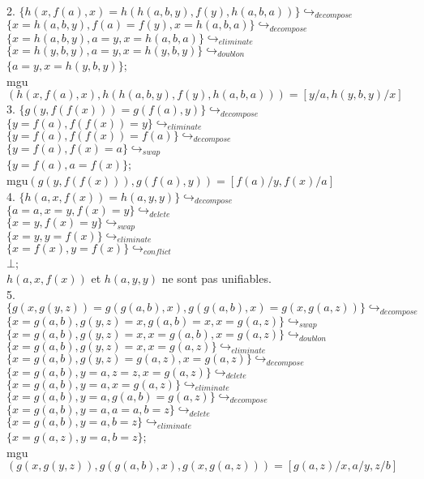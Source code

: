 \documentclass[11pt,letterpaper]{article}
\newcommand\tab[1][12pt]{\hspace*{#1}}
\begin{document}
2. $\{h(x,f(a),x) = h(h(a,b,y),f(y),h(a,b,a))\} \hookrightarrow_{decompose}$\\\tab
$\{x=h(a,b,y), f(a)=f(y), x=h(a,b,a)\} \hookrightarrow_{decompose}$\\\tab
$\{x=h(a,b,y), a=y, x=h(a,b,a)\} \hookrightarrow_{eliminate}$\\\tab
$\{x=h(y,b,y), a=y, x=h(y,b,y)\} \hookrightarrow_{doublon}$\\\tab
$\{a=y, x=h(y,b,y)\}$;\\\tab
mgu$(h(x,f(a),x),h(h(a,b,y),f(y),h(a,b,a))) = [y/a,h(y,b,y)/x]$\\

3. $\{g(y,f(f(x))) = g(f(a),y)\} \hookrightarrow_{decompose}$\\\tab
$\{y=f(a),f(f(x))=y\} \hookrightarrow_{eliminate}$\\\tab
$\{y=f(a),f(f(x))=f(a)\} \hookrightarrow_{decompose}$\\\tab
$\{y=f(a),f(x)=a\} \hookrightarrow_{swap}$\\\tab
$\{y=f(a),a=f(x)\}$;\\\tab
mgu$(g(y,f(f(x))),g(f(a),y)) = [f(a)/y,f(x)/a]$\\

4. $\{h(a,x,f(x)) = h(a,y,y)\} \hookrightarrow_{decompose}$\\\tab
$\{a=a,x=y,f(x)=y\} \hookrightarrow_{delete}$\\\tab
$\{x=y,f(x)=y\} \hookrightarrow_{swap}$\\\tab
$\{x=y,y=f(x)\} \hookrightarrow_{eliminate}$\\\tab
$\{x=f(x),y=f(x)\} \hookrightarrow_{conflict}$\\\tab
$\bot$;\\\tab
$h(a,x,f(x))$ et $h(a,y,y)$ ne sont pas unifiables.\\

5. $\{g(x,g(y,z)) = g(g(a,b),x), g(g(a,b),x) = g(x,g(a,z))\} \hookrightarrow_{decompose}$\\\tab
$\{x=g(a,b), g(y,z)=x, g(a,b)=x, x=g(a,z)\} \hookrightarrow_{swap}$\\\tab
$\{x=g(a,b), g(y,z)=x, x=g(a,b), x=g(a,z)\} \hookrightarrow_{doublon}$\\\tab
$\{x=g(a,b), g(y,z)=x, x=g(a,z)\} \hookrightarrow_{eliminate}$\\\tab
$\{x=g(a,b), g(y,z)=g(a,z), x=g(a,z)\} \hookrightarrow_{decompose}$\\\tab
$\{x=g(a,b), y=a, z=z, x=g(a,z)\} \hookrightarrow_{delete}$\\\tab
$\{x=g(a,b), y=a, x=g(a,z)\} \hookrightarrow_{eliminate}$\\\tab
$\{x=g(a,b), y=a, g(a,b)=g(a,z)\} \hookrightarrow_{decompose}$\\\tab
$\{x=g(a,b), y=a, a=a, b=z\} \hookrightarrow_{delete}$\\\tab
$\{x=g(a,b), y=a, b=z\} \hookrightarrow_{eliminate}$\\\tab
$\{x=g(a,z), y=a, b=z\}$;\\\tab
mgu$(g(x,g(y,z)),g(g(a,b),x),g(x,g(a,z))) = [g(a,z)/x,a/y,z/b]$\\
\end{document}
